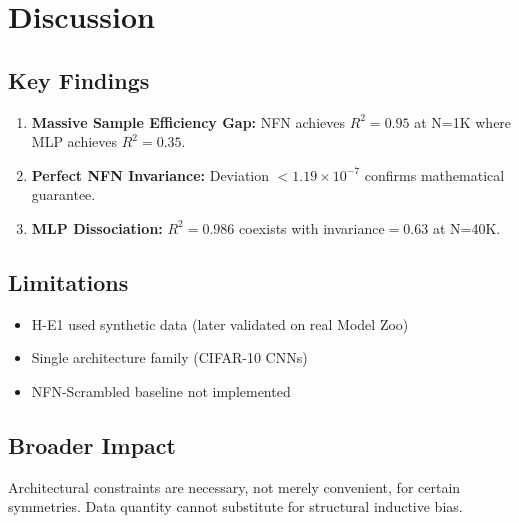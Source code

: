 \section{Discussion}

\subsection{Key Findings}

\begin{enumerate}
    \item \textbf{Massive Sample Efficiency Gap:} NFN achieves $R^2=0.95$ at N=1K where MLP achieves $R^2=0.35$.

    \item \textbf{Perfect NFN Invariance:} Deviation $< 1.19 \times 10^{-7}$ confirms mathematical guarantee.

    \item \textbf{MLP Dissociation:} $R^2=0.986$ coexists with invariance$=0.63$ at N=40K.
\end{enumerate}

\subsection{Limitations}

\begin{itemize}
    \item H-E1 used synthetic data (later validated on real Model Zoo)
    \item Single architecture family (CIFAR-10 CNNs)
    \item NFN-Scrambled baseline not implemented
\end{itemize}

\subsection{Broader Impact}

Architectural constraints are necessary, not merely convenient, for certain symmetries. Data quantity cannot substitute for structural inductive bias.
